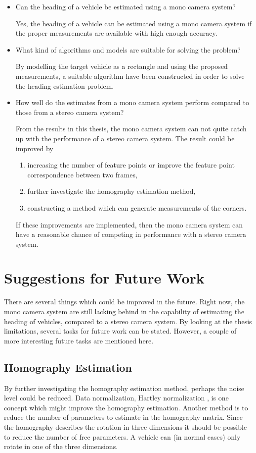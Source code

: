 \begin{itemize}
    \item Can the heading of a vehicle be estimated using a mono camera system?

    Yes, the heading of a vehicle can be estimated using a mono camera system if the proper measurements are available with high enough accuracy.

    \item What kind of algorithms and models are suitable for solving the problem?

    By modelling the target vehicle as a rectangle and using the proposed measurements, a suitable algorithm have been constructed in order to solve the heading estimation problem.

    \item How well do the estimates from a mono camera system perform compared to those from a stereo camera system?

    From the results in this thesis, the mono camera system can not quite catch up with the performance of a stereo camera system.
    The result could be improved by
	\begin{enumerate}[label=\roman*)]
		\item increasing the number of feature points or improve the feature point correspondence between two frames,
		\item further investigate the homography estimation method,
		\item constructing a method which can generate measurements of the corners.
	\end{enumerate}
	If these improvements are implemented, then the mono camera system can have a reasonable chance of competing in performance with a stereo camera system.
\end{itemize}

\section{Suggestions for Future Work}
There are several things which could be improved in the future.
Right now, the mono camera system are still lacking behind in the capability of estimating the heading of vehicles, compared to a stereo camera system.
By looking at the thesis limitations, several tasks for future work can be stated.
However, a couple of more interesting future tasks are mentioned here.

\subsection{Homography Estimation}
By further investigating the homography estimation method, perhaps the noise level could be reduced.
Data normalization, \eg Hartley normalization \cite{Nordberg:2015}, is one concept which might improve the homography estimation.
Another method is to reduce the number of parameters to estimate in the homography matrix.
Since the homography describes the rotation in three dimensions it should be possible to reduce the number of free parameters.
A vehicle can (in normal cases) only rotate in one of the three dimensions.

